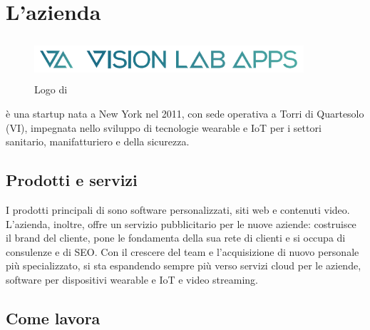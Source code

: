 \chapter{L'azienda\label{cap:lazienda}}
\begin{figure}[H]
   \begin{center}
      \includegraphics[width=10cm,height=1.5cm,keepaspectratio]{immagini/vla-logo}
   \end{center}
   \caption{Logo di \nomeAzienda{}}\label{logovla}
\end{figure}
\nomeAziendaComm{} è una startup nata a New York nel 2011, con sede operativa a Torri di Quartesolo (VI), impegnata nello sviluppo di tecnologie \gls{wearable} e \gls{IoT} per i settori sanitario, manifatturiero e della sicurezza. 

\section{Prodotti e servizi}
I prodotti principali di \nomeAzienda{} sono software personalizzati, siti web e contenuti video. L'azienda, inoltre, offre un servizio pubblicitario per le nuove aziende: costruisce il brand del cliente, pone le fondamenta della sua rete di clienti e si occupa di consulenze e di \gls{SEO}. Con il crescere del team e l'acquisizione di nuovo personale più specializzato, \nomeAzienda{} si sta espandendo sempre più verso servizi cloud per le aziende, software per dispositivi \gls{wearable} e \gls{IoT} e video streaming.

\section{Come lavora}

